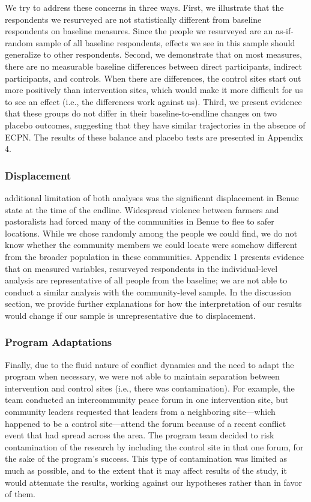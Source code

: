 \documentclass[11pt]{article}
\begin{document}
We try to address these concerns in three ways. First, we illustrate
that the respondents we resurveyed are not statistically different from
baseline respondents on baseline measures. Since the people we
resurveyed are an as-if-random sample of all baseline respondents,
effects we see in this sample should generalize to other respondents.
Second, we demonstrate that on most measures, there are no measurable
baseline differences between direct participants, indirect participants,
and controls. When there are differences, the control sites start out
more positively than intervention sites, which would make it more
difficult for us to see an effect (i.e., the differences work against
us). Third, we present evidence that these groups do not differ in their
baseline-to-endline changes on two placebo outcomes, suggesting that
they have similar trajectories in the absence of ECPN. The results of
these balance and placebo tests are presented in Appendix 4.

\subsubsection{Displacement}\label{displacement}

additional limitation of both analyses was the significant displacement
in Benue state at the time of the endline. Widespread violence between
farmers and pastoralists had forced many of the communities in Benue to
flee to safer locations. While we chose randomly among the people we
could find, we do not know whether the community members we could locate
were somehow different from the broader population in these communities.
Appendix 1 presents evidence that on measured variables, resurveyed
respondents in the individual-level analysis are representative of all
people from the baseline; we are not able to conduct a similar analysis
with the community-level sample. In the discussion section, we provide
further explanations for how the interpretation of our results would
change if our sample is unrepresentative due to displacement.

\subsubsection{Program Adaptations}\label{program-adaptations}

Finally, due to the fluid nature of conflict dynamics and the need to
adapt the program when necessary, we were not able to maintain
separation between intervention and control sites (i.e., there was
contamination). For example, the team conducted an intercommunity peace
forum in one intervention site, but community leaders requested that
leaders from a neighboring site---which happened to be a control
site---attend the forum because of a recent conflict event that had
spread across the area. The program team decided to risk contamination
of the research by including the control site in that one forum, for the
sake of the program's success. This type of contamination was limited as
much as possible, and to the extent that it may affect results of the
study, it would attenuate the results, working against our hypotheses
rather than in favor of them.
\end{document}
